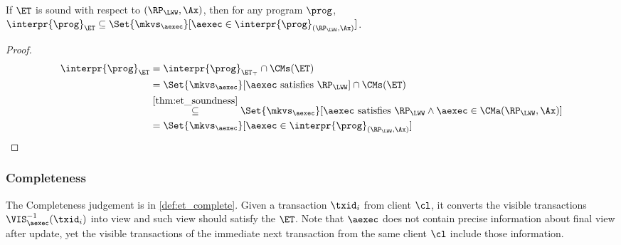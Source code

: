 \begin{corollary}
\label{cor:et-soundness}
If $\ET$ is sound with respect to $(\RP_{\LWW}, \Ax)$, then 
for any program $\prog$, $\interpr{\prog}_{\ET} \subseteq \Set{ \mkvs_{\aexec} }[ \aexec \in \interpr{\prog}_{(\RP_{\LWW}, \Ax)} ]$.
\end{corollary}
\begin{proof}
\begin{align*}
\interpr{\prog}_{\ET} 
& \stackrel{%
}{=} 
\interpr{\prog}_{\ET_\top} \cap \CMs(\ET) \\
& \stackrel{%
}{=} 
\Set{\mkvs_{\aexec} }[ \aexec \text{ satisfies } \RP_{\LWW}] \cap \CMs(\ET) \\
& \stackrel{\cref{thm:et_soundness}}{\subseteq} 
\Set{\mkvs_{\aexec} }[ \aexec \text{ satisfies } \RP_{\LWW} \land \aexec \in \CMa(\RP_{\LWW}, \Ax) ] \\
& \stackrel{%
}{=}
\Set{ \mkvs_{\aexec} }[ \aexec \in \interpr{\prog}_{(\RP_{\LWW}, \Ax)} ]
\end{align*}
\end{proof}

\subsubsection{Completeness}
The Completeness judgement is in \cref{def:et_complete}.
Given a transaction \( \txid_i \) from client \( \cl \), it converts the visible transactions \( \VIS_{\aexec}^{-1}(\txid_{i}) \) into view  and such view should satisfy the \( \ET \).
Note that \( \aexec \) does not contain precise information about final view after update,
yet the visible transactions of the immediate next transaction from the same client \( \cl \) include those information.

